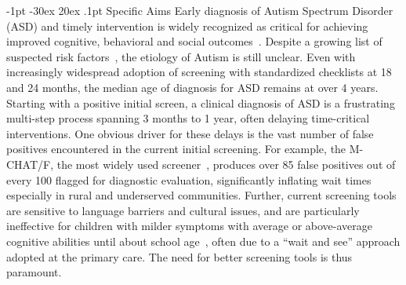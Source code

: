 \documentclass[onecolumn, compsoc,11pt]{IEEEtran}
\makeatletter
\renewcommand\section{\@startsection {section}{1}{\z@}%
                                   {-1pt \@plus -30ex \@minus 20ex}%
                                   {.1pt}%
                                   {\large\bfseries\scshape}}
\makeatother
\begin{document}
\section{Specific Aims}
Early diagnosis of Autism Spectrum Disorder (ASD) and  timely  intervention is widely recognized as critical for achieving improved cognitive, behavioral and social outcomes~\cite{hyman2020identification}.
Despite  a growing list of suspected risk factors~\cite{kalb2012determinants,bisgaier2011access,fenikile2015barriers,pmid27565363}, the etiology of Autism is still unclear. Even with increasingly widespread adoption of screening with standardized checklists at 18 and 24 months, the median age of diagnosis for ASD remains at over 4 years.  Starting with a positive initial screen, a clinical diagnosis of ASD is  a  frustrating multi-step process spanning 3 months to 1 year, often delaying  time-critical interventions. One obvious driver for these delays  is the vast number of false positives encountered in the current initial  screening. For example, the  M-CHAT/F, the most widely used  screener~\cite{robins2014validation,hyman2020identification},  produces    over 85 false positives out of every 100   flagged for  diagnostic evaluation, significantly inflating wait times~\cite{pmid27565363} especially in rural and underserved communities.
Further, current  screening tools are sensitive to language barriers and cultural issues, and are  particularly ineffective for children with milder symptoms  with average or above-average cognitive abilities until about school age~\cite{jashar2016cognitive,hyman2020identification}, often due to a ``wait and see'' approach adopted at the primary care. The need for better screening tools is thus paramount.
\end{document}
